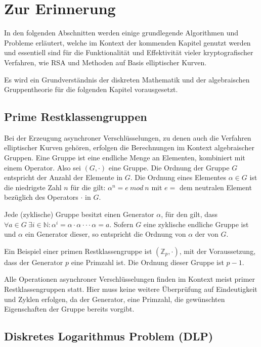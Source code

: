 \chapter{Zur Erinnerung}

In den folgenden Abschnitten werden einige grundlegende Algorithmen und Probleme erläutert, welche im Kontext der kommenden 
Kapitel genutzt werden und essentiell sind für die Funktionalität und Effektivität vieler kryptografischer Verfahren, wie RSA und Methoden 
auf Basis elliptischer Kurven.

Es wird ein Grundverständnis der diskreten Mathematik und der algebraischen Gruppentheorie für die folgenden Kapitel vorausgesetzt.

\section{Prime Restklassengruppen}

Bei der Erzeugung asynchroner Verschlüsselungen, zu denen auch die Verfahren elliptischer Kurven gehören, 
erfolgen die Berechnungen im Kontext algebraischer Gruppen.
Eine Gruppe ist eine endliche Menge an Elementen, kombiniert mit einem Operator. Also sei $(G,\cdotp)$ eine Gruppe.
Die Ordnung der Gruppe $G$ entspricht der Anzahl der Elemente in $G$. Die Ordnung eines Elementes $\alpha \in G$ ist 
die niedrigste Zahl $n$ für die gilt: $\alpha^n = e\ mod\ n$ mit $e =$ dem neutralen Element bezüglich des Operators $\cdotp$ in $G$.

Jede (zyklische) Gruppe besitzt einen Generator $\alpha$, für den gilt, dass $\forall a \in G \ \exists i \in  \mathbb{N}: \alpha^i = \alpha \cdotp \alpha \cdotp \cdotp \cdotp \alpha = a $. Sofern $G$ eine zyklische endliche Gruppe ist und $\alpha$ ein Generator dieser, so entspricht die Ordnung von $\alpha$ der von $G$.

Ein Beispiel einer primen Restklassengruppe ist $(\mathbb{Z}_p,\cdotp)$, mit der Voraussetzung, dass der Generator $p$ eine Primzahl ist. Die Ordnung dieser Gruppe ist $p-1$.

Alle Operationen asynchroner Verschlüsselungen finden im Kontext meist primer Restklassengruppen statt. Hier 
muss keine weitere Überprüfung auf Eindeutigkeit und Zyklen erfolgen, da der Generator, eine Primzahl, die gewünschten
Eigenschaften der Gruppe bereits vorgibt.

\section{Diskretes Logarithmus Problem (DLP)} \label{DLP}

